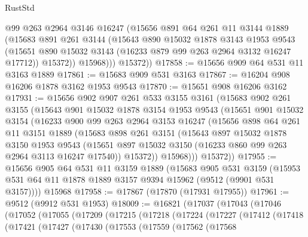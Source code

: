 \begin{lexlean}{RustStd}
\begin{coremodule}
            @99
            @263
            @2964
            @3146
            @16247
            (@15656
              @891
              @64
              @261
              @11
              @3144
              @1889
              (@15683
                @891
                @261
                @3144
                (@15643
                  @890
                  @15032
                  @1878
                  @3143
                  @1953
                  @9543
                  (@15651 @890 @15032 @3143 (@16233 @879 @99 @263 @2964 @3132 @16247 @17712))
                  @15372))
              @15968)))
        @15372))
@17858 := @15656 @909 @64 @531 @11 @3163 @1889
@17861 := @15683 @909 @531 @3163
@17867 := @16204 @908 @16206 @1878 @3162 @1953 @9543
@17870 := @15651 @908 @16206 @3162
@17931 := @15656
    @902
    @907
    @261
    @533
    @3155
    @3161
    (@15683
      @902
      @261
      @3155
      (@15643
        @901
        @15032
        @1878
        @3154
        @1953
        @9543
        (@15651
          @901
          @15032
          @3154
          (@16233
            @900
            @99
            @263
            @2964
            @3153
            @16247
            (@15656
              @898
              @64
              @261
              @11
              @3151
              @1889
              (@15683
                @898
                @261
                @3151
                (@15643
                  @897
                  @15032
                  @1878
                  @3150
                  @1953
                  @9543
                  (@15651 @897 @15032 @3150 (@16233 @860 @99 @263 @2964 @3113 @16247 @17540))
                  @15372))
              @15968)))
        @15372))
@17955 := @15656
    @905
    @64
    @531
    @11
    @3159
    @1889
    (@15683
      @905
      @531
      @3159
      (@15953 @531 @64 @11 @1878 @1889 @3157 @9394 @15962 (@9512 (@9901 @531 @3157))))
    @15968
@17958 := @17867 (@17870 (@17931 @17955))
@17961 := @9512 (@9912 @531 @1953)
@18009 := @16821
    (@17037
      (@17043
        (@17046
          (@17052
            (@17055
              (@17209
                (@17215
                  (@17218
                    (@17224
                      (@17227
                        (@17412
                          (@17418
                            (@17421
                              (@17427
                                (@17430
                                  (@17553
                                    (@17559
                                      (@17562
                                        (@17568

\end{coremodule}
\end{lexlean}
